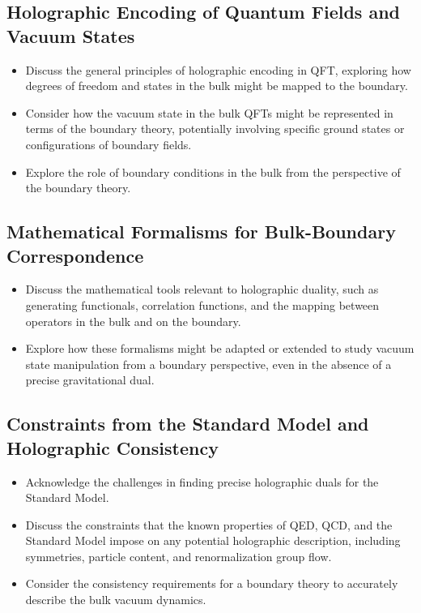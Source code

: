\documentclass{amsart}
\begin{document}
\subsection{Holographic Encoding of Quantum Fields and Vacuum States}
\begin{itemize}
    \item Discuss the general principles of holographic encoding in QFT, exploring how degrees of freedom and states in the bulk might be mapped to the boundary.
    \item Consider how the vacuum state in the bulk QFTs might be represented in terms of the boundary theory, potentially involving specific ground states or configurations of boundary fields.
    \item Explore the role of boundary conditions in the bulk from the perspective of the boundary theory.
\end{itemize}

\subsection{Mathematical Formalisms for Bulk-Boundary Correspondence}
\begin{itemize}
    \item Discuss the mathematical tools relevant to holographic duality, such as generating functionals, correlation functions, and the mapping between operators in the bulk and on the boundary.
    \item Explore how these formalisms might be adapted or extended to study vacuum state manipulation from a boundary perspective, even in the absence of a precise gravitational dual.
\end{itemize}

\subsection{Constraints from the Standard Model and Holographic Consistency}
\begin{itemize}
    \item Acknowledge the challenges in finding precise holographic duals for the Standard Model.
    \item Discuss the constraints that the known properties of QED, QCD, and the Standard Model impose on any potential holographic description, including symmetries, particle content, and renormalization group flow.
    \item Consider the consistency requirements for a boundary theory to accurately describe the bulk vacuum dynamics.
\end{itemize}
\end{document}
